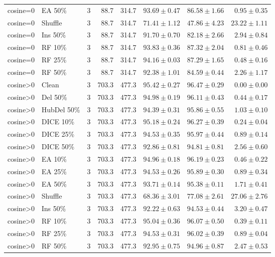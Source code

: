 {\begin{longtable}{llrrrrrr}
cosine=0 & EA 50\% & 3 & 88.7 & 314.7 & $93.69\pm0.47$ & $86.58\pm1.66$ & $0.95\pm0.35$ \\
cosine=0 & Shuffle & 3 & 88.7 & 314.7 & $71.41\pm1.12$ & $47.86\pm4.23$ & $23.22\pm1.11$ \\
cosine=0 & Ins 50\% & 3 & 88.7 & 314.7 & $91.70\pm0.70$ & $82.18\pm2.66$ & $2.94\pm0.84$ \\
cosine=0 & RF 10\% & 3 & 88.7 & 314.7 & $93.83\pm0.36$ & $87.32\pm2.04$ & $0.81\pm0.46$ \\
cosine=0 & RF 25\% & 3 & 88.7 & 314.7 & $94.16\pm0.03$ & $87.29\pm1.65$ & $0.48\pm0.16$ \\
cosine=0 & RF 50\% & 3 & 88.7 & 314.7 & $92.38\pm1.01$ & $84.59\pm0.44$ & $2.26\pm1.17$ \\
cosine>0 & Clean & 3 & 703.3 & 477.3 & $95.42\pm0.27$ & $96.47\pm0.29$ & $0.00\pm0.00$ \\
cosine>0 & Del 50\% & 3 & 703.3 & 477.3 & $94.98\pm0.19$ & $96.11\pm0.43$ & $0.44\pm0.17$ \\
cosine>0 & HubDel 50\% & 3 & 703.3 & 477.3 & $94.39\pm0.31$ & $95.86\pm0.55$ & $1.03\pm0.10$ \\
cosine>0 & DICE 10\% & 3 & 703.3 & 477.3 & $95.18\pm0.24$ & $96.27\pm0.39$ & $0.24\pm0.04$ \\
cosine>0 & DICE 25\% & 3 & 703.3 & 477.3 & $94.53\pm0.35$ & $95.97\pm0.44$ & $0.89\pm0.14$ \\
cosine>0 & DICE 50\% & 3 & 703.3 & 477.3 & $92.86\pm0.81$ & $94.81\pm0.81$ & $2.56\pm0.60$ \\
cosine>0 & EA 10\% & 3 & 703.3 & 477.3 & $94.96\pm0.18$ & $96.19\pm0.23$ & $0.46\pm0.22$ \\
cosine>0 & EA 25\% & 3 & 703.3 & 477.3 & $94.53\pm0.26$ & $95.89\pm0.30$ & $0.89\pm0.34$ \\
cosine>0 & EA 50\% & 3 & 703.3 & 477.3 & $93.71\pm0.14$ & $95.38\pm0.11$ & $1.71\pm0.41$ \\
cosine>0 & Shuffle & 3 & 703.3 & 477.3 & $68.36\pm3.01$ & $77.08\pm2.61$ & $27.06\pm2.76$ \\
cosine>0 & Ins 50\% & 3 & 703.3 & 477.3 & $92.22\pm0.63$ & $94.53\pm0.44$ & $3.20\pm0.47$ \\
cosine>0 & RF 10\% & 3 & 703.3 & 477.3 & $95.04\pm0.36$ & $96.07\pm0.50$ & $0.39\pm0.11$ \\
cosine>0 & RF 25\% & 3 & 703.3 & 477.3 & $94.53\pm0.31$ & $96.02\pm0.39$ & $0.89\pm0.04$ \\
cosine>0 & RF 50\% & 3 & 703.3 & 477.3 & $92.95\pm0.75$ & $94.96\pm0.87$ & $2.47\pm0.53$ \\

\end{longtable}}
